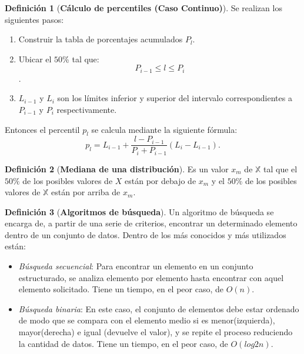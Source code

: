 \documentclass[final,a4paper,romanappendices]{IEEEtran}\usepackage[]{graphicx}\usepackage[]{color}
\theoremstyle{definition}
\newtheorem{definition}{Definición}[subsection]
\begin{document}
\begin{definition}[\bf {Cálculo de percentiles (Caso Continuo)}]
Se realizan los siguientes pasos:
\begin{enumerate}
	\item Construir la tabla de porcentajes acumulados $P_{l}$.
	\item	Ubicar el $50$\% tal que: $$ P_{i-1} \leq l\leq P_{i} $$.
	\item $L_{i-1}$ y $L_{i}$ son los límites inferior y superior del intervalo correspondientes a $P_{i-1}$ y $P_{i}$ respectivamente.
\end{enumerate}

Entonces el percentil $p_{l}$ se calcula mediante la siguiente fórmula: $$ p_{l} = L_{i-1} + \frac{l - P_{i-1}}{P_{i} + P_{i-1}} (L_{i} - L_{i-1}).$$
\end{definition}

\begin{definition}[\bf {Mediana de una distribución}]
Es un valor $x_m$ de $\mathbb{X}$ tal que el $50\%$ de los posibles valores de
 $X$ están por debajo de $x_m$ y el $50\%$ de los posibles valores de $\mathbb{X}$ están por arriba de $x_m$.
\end{definition}

\begin{definition}[\bf {Algoritmos de búsqueda}]
Un algoritmo de búsqueda se encarga de, a partir de una serie de criterios, encontrar un determinado elemento dentro de un conjunto de datos. Dentro de los más conocidos y más utilizados están:

\begin{itemize}
	\item \textit{Búsqueda secuencial}: Para encontrar un elemento en un conjunto estructurado, se analiza elemento por elemento hasta encontrar con aquel elemento solicitado. Tiene un tiempo, en el peor caso, de $O(n)$.

	\item \textit{Búsqueda binaria}: En este caso, el conjunto de elementos debe estar ordenado de modo que se compara con el elemento medio si es menor(izquierda), mayor(derecha) e igual (devuelve el valor), y se repite el proceso reduciendo la cantidad de datos. Tiene un tiempo, en el peor caso, de $O(log2n)$.
\end{itemize}

\end{definition}
\end{document}

